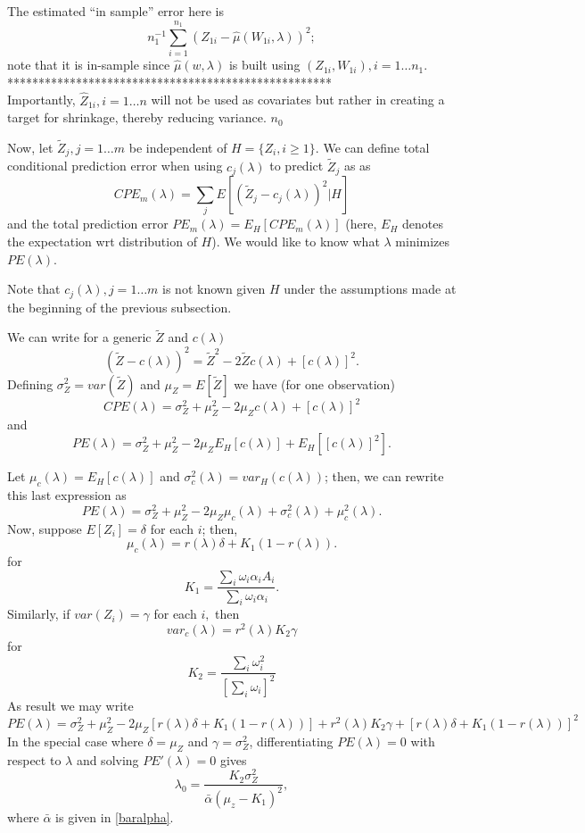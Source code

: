 \documentclass[12pt]{article}
\begin{document}
The estimated ``in sample'' error here is
\[
n^{-1}_1 \sum_{i=1}^{n_1} ( Z_{1i} - \hat{\mu}(W_{1i},\lambda))^2;
\]
note that it is in-sample since $\hat{\mu}(w,\lambda)$ is built
using $(Z_{1i}, W_{1i}), i = 1 \ldots n_1$.\\

****************************************************\\
Importantly,
 $\widehat{Z}_{1i}, i = 1 \ldots n$ will not be used
as covariates but rather in creating a target for shrinkage,
thereby reducing variance.
$n_0$ 


Now, let $\tilde{Z}_j,j = 1\ldots m$ be independent of $H = \{Z_i, i \geq 1\}.$ 
We can define total conditional prediction error when using $c_j(\lambda)$ to predict $\tilde{Z}_j$ as
as
\[
CPE_m(\lambda) = \sum_j E\left[ (\tilde Z_j - c_j(\lambda))^2 | H \right]
\] 
and the total prediction error $PE_m(\lambda) = E_H\left[ CPE_m(\lambda) \right]$ (here, $E_H$ 
denotes the expectation wrt distribution of $H$).  We would like to know what $\lambda$ 
minimizes $PE(\lambda)$. 

Note that $c_j(\lambda), j =1 \ldots m$ is not known given $H$ under the assumptions made
at the beginning of the previous subsection.

We can write for a generic $\tilde Z$ and $c(\lambda)$
\[
(\tilde Z - c(\lambda))^2 = \tilde Z^2 - 2 \tilde Z c(\lambda) + [c(\lambda)]^2.
\]
Defining $\sigma^2_Z = var(\tilde Z)$ and $\mu_Z = E[\tilde Z]$ we have
(for one observation)
\[
CPE(\lambda) = \sigma^2_Z + \mu^2_Z - 2 \mu_Z c(\lambda) + [c(\lambda)]^2
\]
and 
\[
PE(\lambda) = \sigma^2_Z + \mu^2_Z - 2 \mu_Z E_H[c(\lambda)] + E_H[[c(\lambda)]^2].
\]


Let $\mu_c(\lambda) = E_H[c(\lambda)] $ and $\sigma^2_c(\lambda) = var_H(c(\lambda))$; then, we can rewrite
this last expression as 
\[
PE(\lambda) = \sigma^2_Z + \mu^2_Z - 2 \mu_Z \mu_c(\lambda) + \sigma^2_c(\lambda) + \mu^2_c(\lambda).
\]
Now, suppose $E[Z_i] = \delta$ for each $i$; then,
\[
\mu_c(\lambda) = r(\lambda) \delta+ K_1 (1-r(\lambda)).
\]
for
\[
K_1 =  \frac{ \sum_i \omega_i \alpha_i A_i}{ \sum_i \omega_i \alpha_i }.
\]
Similarly, if $var(Z_i) = \gamma$ for each $i,$ then
\[
var_c(\lambda) = r^2(\lambda) K_2 \gamma
\]
for 
\[
K_2 = \frac{ \sum_i \omega_i^2 }{[ \sum_i \omega_i]^2}
\]
As result we may write
\[
PE(\lambda) = \sigma^2_Z + \mu^2_Z - 2 \mu_Z [r(\lambda) \delta + K_1 (1-r(\lambda)) ] + 
r^2(\lambda) K_2 \gamma + 
[r(\lambda) \delta + K_1 (1-r(\lambda))]^2
\]
In the special case where  $\delta = \mu_Z$ and $\gamma = \sigma^2_Z$, differentiating 
$PE(\lambda) = 0$ with respect to $\lambda$ and solving $PE'(\lambda) = 0$ gives
\begin{equation}
\label{lam-opt}
\lambda_0 = \frac{K_2 \sigma^2_Z}{ \bar{\alpha} (\mu_z - K_1)^2},
\end{equation}
where $\bar \alpha$ is given in \eqref{baralpha}.
\end{document}
